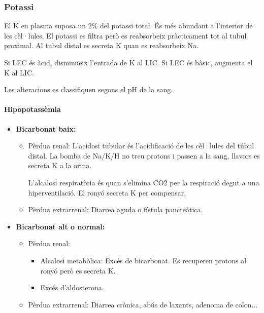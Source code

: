 \subsubsection{Potassi}
\label{sec:potassi}
El K en plasma suposa un 2\% del potassi total. És més abundant a
l'interior de les cèl·lules. El potassi es filtra però es reabsorbeix
pràcticament tot al tubul proximal. Al tubul distal es secreta K quan
es reabsorbeix Na.

Si LEC és àcid, disminueix l'entrada de K al LIC.
Si LEC és bàsic, augmenta el K al LIC.

Les alteracions es classifiquen segons el pH de la sang.

\paragraph{Hipopotassèmia}

\begin{itemize}
\item \textbf{Bicarbonat baix:}
  \begin{itemize}
  \item Pèrdua renal: L'acidosi tubular és l'acidificació de les
    cèl·lules del túbul distal. La bomba de Na/K/H no treu protons i
    passen a la sang, llavors es secreta K a la orina.

L'alcalosi respiratòria és quan s'elimina CO2 per la respiració degut
a una hiperventilació. El ronyó secreta K per compensar.

  \item Pèrdua extrarrenal: Diarrea aguda o fístula pancreàtica.
  \end{itemize}

\item \textbf{Bicarbonat alt o normal:}
  \begin{itemize}
  \item Pèrdua renal:
    \begin{itemize}
    \item Alcalosi metabòlica: Excés de bicarbonat. Es recuperen
      protons al ronyó però es secreta K.
    \item Excés d'aldosterona.
    \end{itemize}

  \item Pèrdua extrarrenal: Diarrea crònica, abús de laxants, adenoma
    de colon...
  \end{itemize}
\end{itemize}

